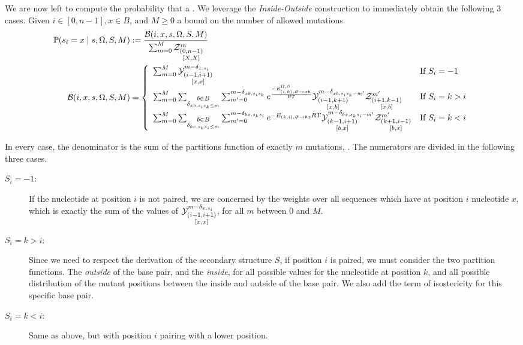 We are now left to compute the probability that a .
We leverage the \emph{Inside-Outside} construction to immediately obtain the following $3$ cases.
Given $i\in[0,n-1],x\in B$, and $M\geq 0$ a bound on the number of allowed mutations. 
\begin{align*}
	\mathbb{P}(s_i = x\mid s,\Omega, S,M) &:= \frac{\mathcal{B}(i,x,s,\Omega,S,M)}{\sum_{m=0}^{M}\Z{0,n-1}{m}{X,X}}\\ 
\mathcal{B}(i,x,s,\Omega,S,M)&=
 \left\{
	\begin{array}{ll}
			\sum_{m=0}^{M}
			\Y{i-1,i+1}{m-\Kron_{x,s_i}}{x,x}
		&\text{If }S_i = -1\\
			\sum_{m=0}^{M}
			\sum_{\substack{b\in B\\\Kron_{xb,s_is_k\leq m}}}
			\sum_{m'=0}^{m-\Kron_{xb,s_is_k}}
     	 e^{\frac{-E_{(i,k),\varnothing\to xb}^{\Omega,\beta} }{RT}}
			\Y{i-1,k+1}{m-\Kron_{xb,s_is_k-m'}}{x,b}
			\Z{i+1,k-1}{m'}{x,b}
		&\text{If }S_i=k>i\\
			\sum_{m=0}^{M}
			\sum_{\substack{b\in B\\\Kron_{bx,s_ks_i\leq m}}}
			\sum_{m'=0}^{m-\Kron_{bx,s_ks_i}}
     	 e^{-E_{(k,i),\varnothing\to bx}{RT}}
			\Y{k-1,i+1}{m-\Kron_{bx,s_ks_i-m'}}{b,x}
			\Z{k+1,i-1}{m'}{b,x}
		&\text{If }S_i=k<i
	\end{array}\right.
\end{align*}

In every case, the denominator is the sum of the partitions function of exactly $m$ mutations, . The numerators are divided in the following three cases.
\begin{description}
\item[$S_i=-1$:] If the nucleotide at position $i$ is not paired, we are concerned by the weights
over all sequences which have at position $i$ nucleotide $x$, which is exactly the sum
of the values of $\Y{i-1,i+1}{m-\Kron_{x,s_i}}{x,x}$, for all $m$ between $0$ and $M$.
\item[$S_i=k>i$:] Since we need to respect the derivation of the secondary structure $S$, if 
position $i$ is paired, we must consider the two partition functions. The \emph{outside} of the 
base pair, and the \emph{inside}, for all possible values for the nucleotide at position $k$, and
all possible distribution of the mutant positions between the inside and outside of the base pair. We also add the term of isostericity for this specific base pair.
\item[$S_i=k<i$:] Same as above, but with position $i$ pairing with a lower position.
\end{description}
